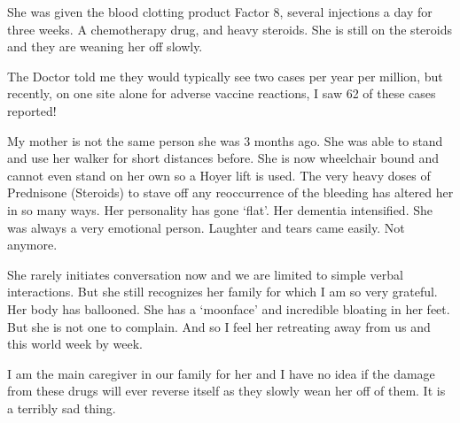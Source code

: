 {She was given the blood clotting product Factor 8, several injections a day for
three weeks. A chemotherapy drug, and heavy steroids. She is still on the
steroids and they are weaning her off slowly.

The Doctor told me they would typically see two cases per year per million, but
recently, on one site alone for adverse vaccine reactions, I saw 62 of these
cases reported!

My mother is not the same person she was 3 months ago. She was able to stand and
use her walker for short distances before. She is now wheelchair bound and
cannot even stand on her own so a Hoyer lift is used. The very heavy doses of
Prednisone (Steroids) to stave off any reoccurrence of the bleeding has altered
her in so many ways. Her personality has gone ‘flat’. Her dementia
intensified. She was always a very emotional person. Laughter and tears came
easily. Not anymore.

She rarely initiates conversation now and we are limited to simple verbal
interactions. But she still recognizes her family for which I am so very
grateful. Her body has ballooned. She has a ‘moonface’ and incredible bloating
in her feet. But she is not one to complain. And so I feel her retreating away
from us and this world week by week.

I am the main caregiver in our family for her and I have no idea if the damage
from these drugs will ever reverse itself as they slowly wean her off of
them. It is a terribly sad thing.

}
